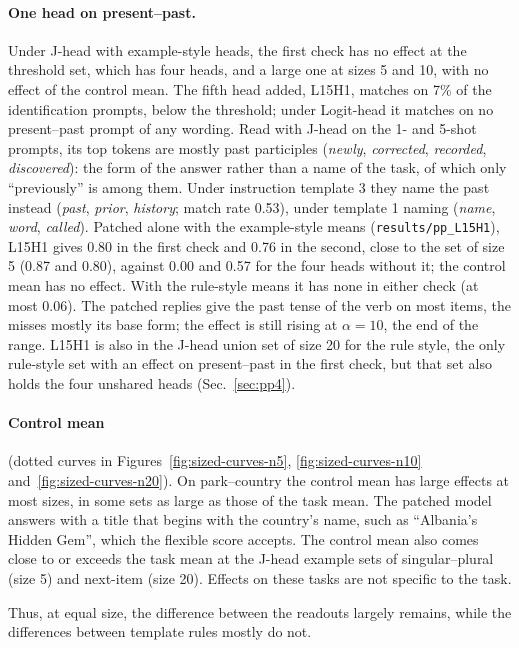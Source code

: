 \documentclass[11pt,a4paper]{article}
\begin{document}
\paragraph{One head on present--past.} Under J-head with example-style heads, the first check has no effect at the threshold set, which has four heads, and a large one at sizes 5 and 10, with no effect of the control mean. The fifth head added, L15H1, matches on 7\% of the identification prompts, below the threshold; under Logit-head it matches on no present--past prompt of any wording. Read with J-head on the 1- and 5-shot prompts, its top tokens are mostly past participles (\emph{newly}, \emph{corrected}, \emph{recorded}, \emph{discovered}): the form of the answer rather than a name of the task, of which only ``previously'' is among them. Under instruction template 3 they name the past instead (\emph{past}, \emph{prior}, \emph{history}; match rate 0.53), under template 1 naming (\emph{name}, \emph{word}, \emph{called}). Patched alone with the example-style means (\texttt{results/pp\_L15H1}), L15H1 gives 0.80 in the first check and 0.76 in the second, close to the set of size 5 (0.87 and 0.80), against 0.00 and 0.57 for the four heads without it; the control mean has no effect. With the rule-style means it has none in either check (at most 0.06). The patched replies give the past tense of the verb on most items, the misses mostly its base form; the effect is still rising at $\alpha=10$, the end of the range. L15H1 is also in the J-head union set of size 20 for the rule style, the only rule-style set with an effect on present--past in the first check, but that set also holds the four unshared heads (Sec.~\ref{sec:pp4}).

\paragraph{Control mean} (dotted curves in Figures~\ref{fig:sized-curves-n5}, \ref{fig:sized-curves-n10} and~\ref{fig:sized-curves-n20}). On park--country the control mean has large effects at most sizes, in some sets as large as those of the task mean. The patched model answers with a title that begins with the country's name, such as ``Albania's Hidden Gem'', which the flexible score accepts. The control mean also comes close to or exceeds the task mean at the J-head example sets of singular--plural (size 5) and next-item (size 20). Effects on these tasks are not specific to the task.

Thus, at equal size, the difference between the readouts largely remains, while the differences between template rules mostly do not.
\end{document}
